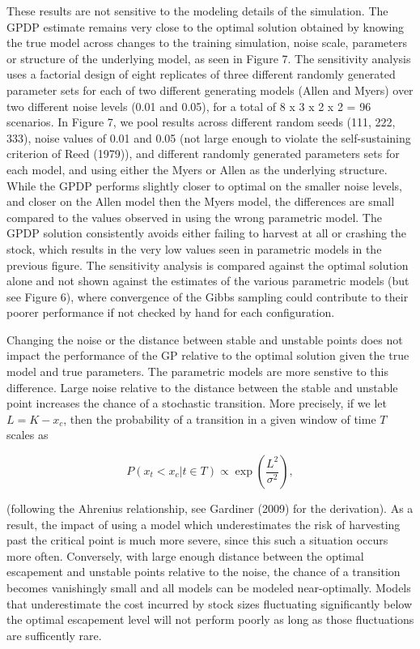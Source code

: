 \documentclass[author-year, 12pt,review]{elsarticle} %
\begin{document}
These results are not sensitive to the modeling details of the
simulation. The GPDP estimate remains very close to the optimal solution
obtained by knowing the true model across changes to the training
simulation, noise scale, parameters or structure of the underlying
model, as seen in Figure 7. The sensitivity analysis uses a factorial
design of eight replicates of three different randomly generated
parameter sets for each of two different generating models (Allen and
Myers) over two different noise levels (0.01 and 0.05), for a total of 8
x 3 x 2 x 2 = 96 scenarios. In Figure 7, we pool results across
different random seeds (111, 222, 333), noise values of 0.01 and 0.05
(not large enough to violate the self-sustaining criterion of Reed
(1979)), and different randomly generated parameters sets for each
model, and using either the Myers or Allen as the underlying structure.
While the GPDP performs slightly closer to optimal on the smaller noise
levels, and closer on the Allen model then the Myers model, the
differences are small compared to the values observed in using the wrong
parametric model. The GPDP solution consistently avoids either failing
to harvest at all or crashing the stock, which results in the very low
values seen in parametric models in the previous figure. The sensitivity
analysis is compared against the optimal solution alone and not shown
against the estimates of the various parametric models (but see Figure
6), where convergence of the Gibbs sampling could contribute to their
poorer performance if not checked by hand for each configuration.

Changing the noise or the distance between stable and unstable points
does not impact the performance of the GP relative to the optimal
solution given the true model and true parameters. The parametric models
are more senstive to this difference. Large noise relative to the
distance between the stable and unstable point increases the chance of a
stochastic transition. More precisely, if we let $L = K - x_c$, then the
probability of a transition in a given window of time $T$ scales as

\[P(x_t < x_c | t \in T) \propto  \exp\left(\frac{L^2}{\sigma^2}\right),\]

(following the Ahrenius relationship, see Gardiner (2009) for the
derivation). As a result, the impact of using a model which
underestimates the risk of harvesting past the critical point is much
more severe, since this such a situation occurs more often. Conversely,
with large enough distance between the optimal escapement and unstable
points relative to the noise, the chance of a transition becomes
vanishingly small and all models can be modeled near-optimally. Models
that underestimate the cost incurred by stock sizes fluctuating
significantly below the optimal escapement level will not perform poorly
as long as those fluctuations are sufficently rare.
\end{document}
